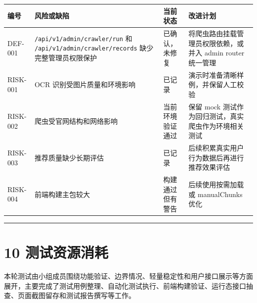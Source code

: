 {\def\LTcaptype{none} %
\begin{longtable}[]{@{}|
  >{\raggedright\arraybackslash}p{}|
  >{\raggedright\arraybackslash}p{}|
  >{\raggedright\arraybackslash}p{}|
  >{\raggedright\arraybackslash}p{}|@{}}
\hline
\rowcolor{gray!12}
\begin{minipage}[b]{\linewidth}\raggedright
\bfseries 编号
\end{minipage} & \begin{minipage}[b]{\linewidth}\raggedright
\bfseries 风险或缺陷
\end{minipage} & \begin{minipage}[b]{\linewidth}\raggedright
\bfseries 当前状态
\end{minipage} & \begin{minipage}[b]{\linewidth}\raggedright
\bfseries 改进计划
\end{minipage} \\
\hline
\endhead
\hline
\endlastfoot
DEF-001 & \passthrough{\lstinline!/api/v1/admin/crawler/run!} 和
\passthrough{\lstinline!/api/v1/admin/crawler/records!}
缺少完整管理员权限保护 & 已确认，未修复 &
将爬虫路由挂载管理员权限依赖，或并入 admin router 统一管理 \\
\hline
RISK-001 & OCR 识别受图片质量和环境影响 & 已记录 &
演示时准备清晰样例，并保留人工校验 \\
\hline
RISK-002 & 爬虫受官网结构和网络影响 & 当前环境验证通过 & 保留 mock
测试作为回归测试，真实爬虫作为环境相关测试 \\
\hline
RISK-003 & 推荐质量缺少长期评估 & 已记录 &
后续积累真实用户行为数据后再进行推荐效果评估 \\
\hline
RISK-004 & 前端构建主包较大 & 构建通过但有警告 & 后续使用按需加载或
manualChunks 优化 \\
\hline
\end{longtable}
}

\begin{center}\rule{0.5\linewidth}{0.5pt}\end{center}

\section{10 测试资源消耗}\label{ux6d4bux8bd5ux8d44ux6e90ux6d88ux8017}

本轮测试由小组成员围绕功能验证、边界情况、轻量稳定性和用户接口展示等方面展开，主要完成了测试用例整理、自动化测试执行、前端构建验证、运行态接口抽查、页面截图留存和测试报告撰写等工作。

